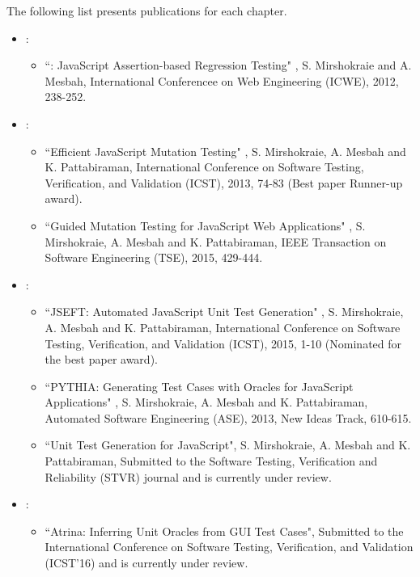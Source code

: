 The following list presents publications for each chapter.
\begin{itemize}
\item {}:
\begin{itemize}
\item ``\jsart: JavaScript Assertion-based Regression Testing" \cite{mirshokraie:icwe12},
S. Mirshokraie and A. Mesbah, International Conferencee on Web Engineering (ICWE), 2012, 238-252.
\end{itemize}
\item {}:
\begin{itemize}
\item ``Efficient JavaScript Mutation Testing" \cite{mirshokraie:icst13},
S. Mirshokraie, A. Mesbah and K. Pattabiraman, International Conference on Software Testing, Verification, and Validation (ICST), 2013, 74-83 (Best paper Runner-up award).
\item ``Guided Mutation Testing for JavaScript Web Applications" \cite{mirshokraie:tse15},
S. Mirshokraie, A. Mesbah and K. Pattabiraman, IEEE Transaction on Software Engineering (TSE), 2015, 429-444.
\end{itemize}
\item {}:
\begin{itemize}
\item ``JSEFT: Automated JavaScript Unit Test Generation" \cite{mirshokraie:icst15},
S. Mirshokraie, A. Mesbah and K. Pattabiraman, International Conference on Software Testing, Verification, and Validation (ICST), 2015, 1-10 (Nominated for the best paper award).
\item ``PY\-THIA: Generating Test Cases with Oracles
for JavaScript Applications" \cite{shabnam:ase13},
S. Mirshokraie, A. Mesbah and K. Pattabiraman, Automated Software Engineering (ASE), 2013, New Ideas Track, 610-615.
\item ``Unit Test Generation for JavaScript", S. Mirshokraie, A. Mesbah and K. Pattabiraman,
Submitted to the Software Testing, Verification and Reliability (STVR) journal and is currently under review. 
\end{itemize} 
\item {}:
\begin{itemize}
\item ``Atrina: Inferring Unit Oracles from GUI Test Cases",
Submitted to the International Conference on Software Testing, Verification, and Validation (ICST'16) and is currently under review.
\end{itemize}
\end{itemize}

